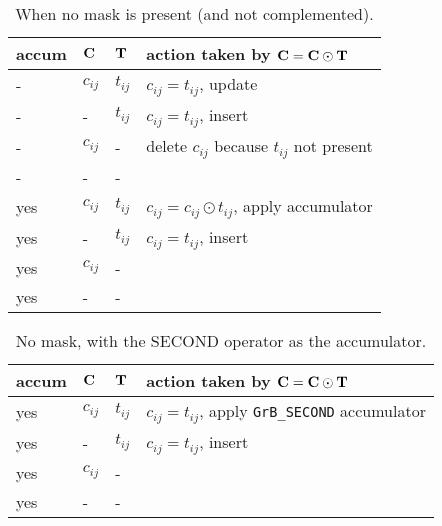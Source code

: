 \documentclass[12pt]{article}
\begin{document}
\begin{table}[h]
\begin{center}
{\small
\begin{tabular}{lll|l}
\hline
       accum & ${\bf C}$ & ${\bf T}$        & action taken by ${\bf C = C \odot T}$ \\
\hline
        -   & $c_{ij}$ & $t_{ij}$         &  $c_{ij} = t_{ij}$, update \\
        -   &  -       & $t_{ij}$         &  $c_{ij} = t_{ij}$, insert \\
        -   & $c_{ij}$ &  -               &  delete $c_{ij}$ because $t_{ij}$ not present \\
        -   &  -       &  -               &   \\
\hline
        yes & $c_{ij}$ & $t_{ij}$         &  $c_{ij} = c_{ij} \odot t_{ij}$, apply accumulator \\
        yes &  -       & $t_{ij}$         &  $c_{ij} = t_{ij}$, insert \\
        yes & $c_{ij}$ &  -               &   \\
        yes &  -       &  -               &   \\
\hline
\end{tabular}
}
\caption{When no mask is present (and not complemented).
\label{tab:maskaccum_nomask}}
\end{center}
\end{table}

\begin{table}[h]
\begin{center}
{\small
\begin{tabular}{lll|l}
\hline
       accum & ${\bf C}$ & ${\bf T}$        & action taken by ${\bf C = C \odot T}$ \\
\hline
        yes & $c_{ij}$ & $t_{ij}$         &  $c_{ij} = t_{ij}$, apply \verb'GrB_SECOND' accumulator \\
        yes &  -       & $t_{ij}$         &  $c_{ij} = t_{ij}$, insert \\
        yes & $c_{ij}$ &  -               &   \\
        yes &  -       &  -               &   \\
\hline
\end{tabular}
}
\caption{No mask, with the SECOND operator as the accumulator.
\label{tab:maskaccum_nomask_2nd}}
\end{center}
\end{table}
\end{document}

